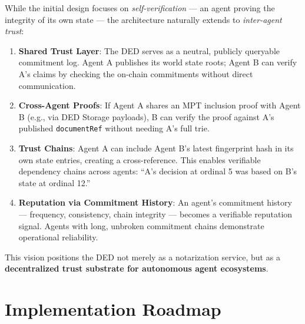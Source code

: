 \documentclass[11pt,a4paper]{article}
\begin{document}
While the initial design focuses on \emph{self-verification} --- an agent proving the
integrity of its own state --- the architecture naturally extends to \emph{inter-agent
trust}:

\begin{enumerate}
  \item \textbf{Shared Trust Layer}: The DED serves as a neutral, publicly queryable
    commitment log. Agent A publishes its world state roots; Agent B can verify A's claims
    by checking the on-chain commitments without direct communication.

  \item \textbf{Cross-Agent Proofs}: If Agent A shares an MPT inclusion proof with Agent B
    (e.g., via DED Storage payloads), B can verify the proof against A's published
    \texttt{documentRef} without needing A's full trie.

  \item \textbf{Trust Chains}: Agent A can include Agent B's latest fingerprint hash in its
    own state entries, creating a cross-reference. This enables verifiable dependency
    chains across agents: ``A's decision at ordinal 5 was based on B's state at ordinal
    12.''

  \item \textbf{Reputation via Commitment History}: An agent's commitment history ---
    frequency, consistency, chain integrity --- becomes a verifiable reputation signal.
    Agents with long, unbroken commitment chains demonstrate operational reliability.
\end{enumerate}

This vision positions the DED not merely as a notarization service, but as a
\textbf{decentralized trust substrate for autonomous agent ecosystems}.


\section{Implementation Roadmap}
\end{document}
